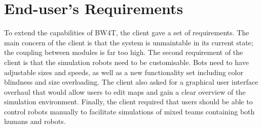 
\section{End-user's Requirements}

To extend the capabilities of BW4T, the client gave a set of requirements. The main concern of the client is that the system is unmaintable in its current state; the coupling between modules is far too high. The second requirement of the client is that the simulation robots need to be customisable. Bots need to have adjustable sizes and speeds, as well as a new functionality set including color blindness and size overloading. The client also asked for a graphical user interface overhaul that would allow users to edit maps and gain a clear overview of the simulation environment. Finally, the client required that users should be able to control robots manually to facilitate simulations of mixed teams containing both humans and robots.